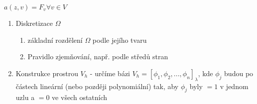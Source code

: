 \documentclass[../main.tex]{subfiles}
\begin{document}
 $a(z,v) = F_v \forall v \in V$ 


\begin{enumerate}
    \item Diskretizace $\Omega$ 
    \begin{enumerate}
        \item základní rozdělení $\Omega$ podle jejího tvaru
        \item Pravidlo zjemňování, např. podle středů stran
    \end{enumerate}
    \item Konstrukce prostrou $V_h$ - určíme bázi $V_h =  [\phi_1, \phi_2, ... , \phi_n ]_\lambda$, kde $\phi_j$ budou po částech lineární (nebo později polynomiální) tak, aby $\phi_j$ byly $=1$ v jednom uzlu a $=0$ ve všech ostatních
\end{enumerate}

\end{document}

